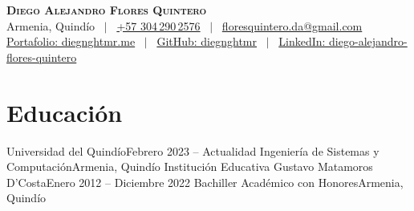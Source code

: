 \documentclass[letterpaper,12pt]{fed-res} %
\begin{document}
\begin{center}
    \textbf{\Huge \scshape Diego Alejandro Flores Quintero} \\ \vspace{1pt}
    Armenia, Quindío \ $|$ \
    \href{http://wa.me/+573042902576}{+57 304\,290\,2576} \ $|$ \
    \href{mailto:floresquintero.da@gmail.com}{floresquintero.da@gmail.com} \\[1pt]
    \href{https://www.diegnghtmr.me}{Portafolio: diegnghtmr.me} \ $|$ \
    \href{https://github.com/diegnghtmr}{GitHub: diegnghtmr} \ $|$ \
    \href{https://www.linkedin.com/in/diego-alejandro-flores-quintero/}{LinkedIn: diego-alejandro-flores-quintero}
\end{center}


\section{Educación}
    \resumeSubHeadingListStart
        \resumeSubheading
            {Universidad del Quindío}{Febrero 2023 -- Actualidad}
            {Ingeniería de Sistemas y Computación}{Armenia, Quindío}
        \resumeSubheading
            {Institución Educativa Gustavo Matamoros D'Costa}{Enero 2012 -- Diciembre 2022}
            {Bachiller Académico con Honores}{Armenia, Quindío}
    \resumeSubHeadingListEnd

\end{document}
